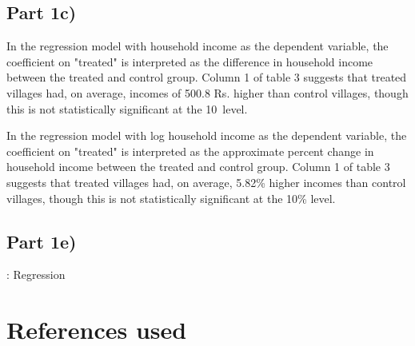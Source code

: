 \documentclass[12pt]{article}
\begin{document}
\subsection*{Part 1c)}

In the regression model with household income as the dependent variable, the coefficient on "treated" is interpreted as the difference in household income between the treated and control group. Column 1 of table 3 suggests that treated villages had, on average, incomes of 500.8 Rs. higher than control villages, though this is not statistically significant at the 10\ level.

In the regression model with log household income as the dependent variable, the coefficient on "treated" is interpreted as the approximate percent change in household income between the treated and control group. Column 1 of table 3 suggests that treated villages had, on average, 5.82\% higher incomes than control villages, though this is not statistically significant at the 10\% level.

\subsection*{Part 1e)}




\begin{table}[H]
    \centering
    \scriptsize %
    \setlength{\tabcolsep}{2pt}
    \renewcommand{\arraystretch}{1.15}
    
    \caption{: Regression}
\end{table}





\section{References used}
\end{document}
